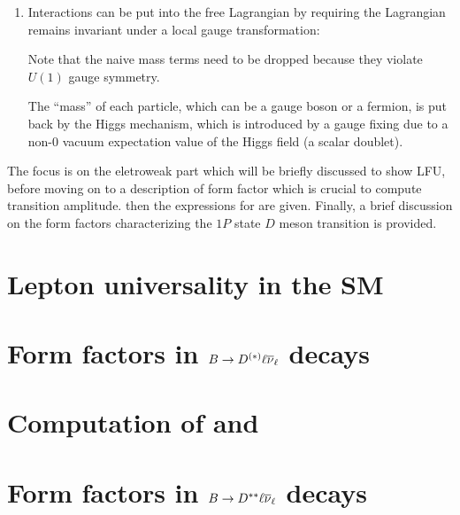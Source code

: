 \begin{enumerate}
    \item Interactions can be put into the free Lagrangian by requiring the
        Lagrangian remains invariant under a local gauge transformation:

        Note that the naive mass terms need to be dropped because they violate
        $U(1)$ gauge symmetry.

        The ``mass'' of each particle, which can be a gauge boson or a fermion,
        is put back by the Higgs mechanism,
        which is introduced by a gauge fixing due to a non-0 vacuum expectation
        value of the Higgs field (a scalar doublet).
\end{enumerate}

The focus is on the eletroweak part which will be briefly discussed to show LFU,
before moving on to a description of form factor which is crucial to compute
transition amplitude.
then the expressions for \RDX are given.
Finally, a brief discussion on the form factors characterizing the $1P$ state
$D$ meson transition is provided.


\section{Lepton universality in the SM}
\label{ref:theory:lfu}


\section{Form factors in $B \rightarrow D^{(*)}\ell{\ensuremath{{\overline{\nu}}_\ell}}$ decays}
\label{ref:theory:ff-d0-dst}


\section{Computation of \RD and \RDst}
\label{ref:theory:rdx}


\section{Form factors in $B \rightarrow D^{**}\ell{\ensuremath{{\overline{\nu}}_\ell}}$ decays}
\label{ref:theory:ff-dstst}

